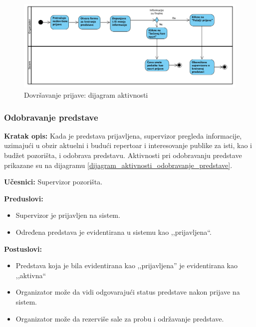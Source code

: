 \documentclass[a4paper]{article}
\begin{document}
\begin{figure}[H]
  \begin{center}
      \includegraphics[width=160mm]{../images/dijagram_aktivnosti_dovrsavanje_prijave.png}
  \end{center}
  \caption{Dovršavanje prijave: dijagram aktivnosti}
  \label{dijagram_aktivnosti_dovrsavanje_prijave}
\end{figure}


\subsubsection{Odobravanje predstave}
\noindent\textbf{Kratak opis:} Kada je predstava prijavljena, supervizor pregleda informacije, uzimajući u obzir aktuelni i budući repertoar i interesovanje publike za isti, kao i budžet pozorišta, i odobrava predstavu. Aktivnosti pri odobravanju predstave prikazane su na dijagramu \ref{dijagram_aktivnosti_odobravanje_predstave}.

\noindent\textbf{Učesnici:} Supervizor pozorišta.

\noindent\textbf{Preduslovi:}
  \begin{itemize}
    \item Supervizor je prijavljen na sistem.
    \item Određena predstava je evidentirana u sistemu kao ,,prijavljena``.
  \end{itemize}

\noindent\textbf{Postuslovi:} 
  \begin{itemize}
    \item Predstava koja je bila evidentirana kao ,,prijavljena'' je evidentirana kao ,,aktivna``
    \item Organizator može da vidi odgovarajući status predstave nakon prijave na sistem.
    \item Organizator može da rezerviše sale za probu i održavanje predstave. 
  \end{itemize}
\end{document}
